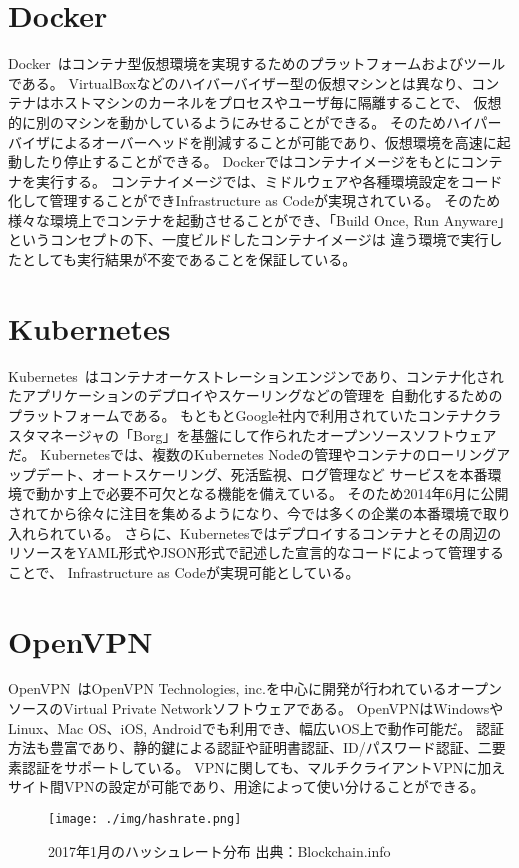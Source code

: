 \section{Docker}
\label{background:docker}

Docker~\cite{Docker}はコンテナ型仮想環境を実現するためのプラットフォームおよびツールである。
VirtualBoxなどのハイバーバイザー型の仮想マシンとは異なり、コンテナはホストマシンのカーネルをプロセスやユーザ毎に隔離することで、
仮想的に別のマシンを動かしているようにみせることができる。
そのためハイパーバイザによるオーバーヘッドを削減することが可能であり、仮想環境を高速に起動したり停止することができる。
Dockerではコンテナイメージをもとにコンテナを実行する。
コンテナイメージでは、ミドルウェアや各種環境設定をコード化して管理することができInfrastructure as Codeが実現されている。
そのため様々な環境上でコンテナを起動させることができ、「Build Once, Run Anyware」というコンセプトの下、一度ビルドしたコンテナイメージは
違う環境で実行したとしても実行結果が不変であることを保証している。

\section{Kubernetes}
\label{background:kubernetes}

Kubernetes~\cite{Kubernetes}はコンテナオーケストレーションエンジンであり、コンテナ化されたアプリケーションのデプロイやスケーリングなどの管理を
自動化するためのプラットフォームである。
もともとGoogle社内で利用されていたコンテナクラスタマネージャの「Borg」を基盤にして作られたオープンソースソフトウェアだ。
Kubernetesでは、複数のKubernetes Nodeの管理やコンテナのローリングアップデート、オートスケーリング、死活監視、ログ管理など
サービスを本番環境で動かす上で必要不可欠となる機能を備えている。
そのため2014年6月に公開されてから徐々に注目を集めるようになり、今では多くの企業の本番環境で取り入れられている。
さらに、Kubernetesではデプロイするコンテナとその周辺のリソースをYAML形式やJSON形式で記述した宣言的なコードによって管理することで、
Infrastructure as Codeが実現可能としている。

\section{OpenVPN}
\label{background:openvpn}

OpenVPN~\cite{OpenVPN}はOpenVPN Technologies, inc.を中心に開発が行われているオープンソースのVirtual Private Networkソフトウェアである。
OpenVPNはWindowsやLinux、Mac OS、iOS, Androidでも利用でき、幅広いOS上で動作可能だ。
認証方法も豊富であり、静的鍵による認証や証明書認証、ID/パスワード認証、二要素認証をサポートしている。
VPNに関しても、マルチクライアントVPNに加えサイト間VPNの設定が可能であり、用途によって使い分けることができる。

\begin{figure}[h]
    \begin{center}
        \texttt{[image: ./img/hashrate.png]}
        \caption{2017年1月のハッシュレート分布 出典：Blockchain.info\cite{bitcoinhashrate}}
        \label{img:hashrate}
    \end{center}
\end{figure}
\fi
